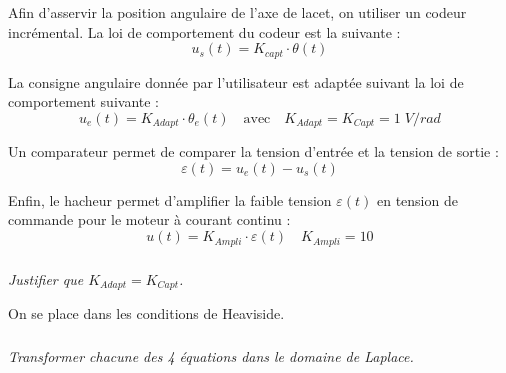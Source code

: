 \documentclass[11pt,oneside]{article}
\begin{document}
Afin d'asservir la position angulaire de l'axe de lacet, on utiliser un codeur incrémental. La loi de comportement du codeur est la suivante :
$$
u_s(t)= K_{capt} \cdot \theta(t)
$$

La consigne angulaire donnée par l'utilisateur est adaptée suivant la loi de comportement suivante : 
$$
u_e(t)= K_{Adapt} \cdot \theta_e(t) \quad \text{avec} \quad K_{Adapt} = K_{Capt} = 1 \; V/rad
$$

Un comparateur permet de comparer la tension d'entrée et la tension de sortie : 
$$
\varepsilon(t)=u_e(t) - u_s(t)
$$

Enfin, le hacheur permet d'amplifier la faible tension $\varepsilon(t)$ en tension de commande pour le moteur à courant continu :
$$
u(t)=K_{Ampli} \cdot \varepsilon(t) \quad K_{Ampli}=10
$$

\subparagraph{}
\textit{Justifier que $K_{Adapt} = K_{Capt}$.}



On se place dans les conditions de Heaviside.

\subparagraph{}
\textit{Transformer chacune des 4 équations dans le domaine de Laplace.}

\end{document}
